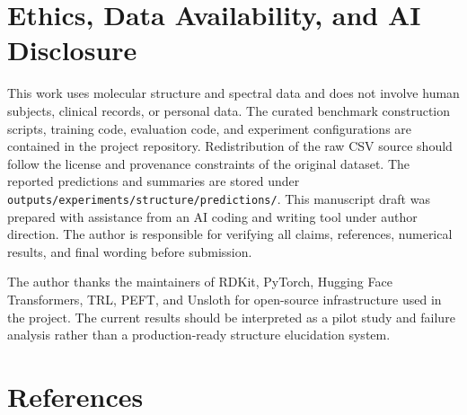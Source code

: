 \documentclass{article}
\begin{document}
\section*{Ethics, Data Availability, and AI Disclosure}

This work uses molecular structure and spectral data and does not involve human subjects, clinical records, or personal data. The curated benchmark construction scripts, training code, evaluation code, and experiment configurations are contained in the project repository. Redistribution of the raw CSV source should follow the license and provenance constraints of the original dataset. The reported predictions and summaries are stored under \texttt{outputs/experiments/structure/predictions/}. This manuscript draft was prepared with assistance from an AI coding and writing tool under author direction. The author is responsible for verifying all claims, references, numerical results, and final wording before submission.

\begin{ack}
The author thanks the maintainers of RDKit, PyTorch, Hugging Face Transformers, TRL, PEFT, and Unsloth for open-source infrastructure used in the project. The current results should be interpreted as a pilot study and failure analysis rather than a production-ready structure elucidation system.
\end{ack}

\section*{References}
\end{document}
